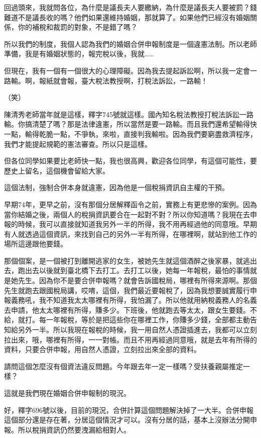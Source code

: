 \documentclass[]{ctexbook}
\begin{document}
回過頭來，我就問各位，為什麼是議長夫人要繳納，為什麼是議長夫人要被罰？錢難道不是議長收的嗎？他們如果還維持婚姻，那就算了。如果他們已經沒有婚姻關係，你的補稅和裁罰的對象，不是錯了嗎？

所以我們的制度，我個人認為我們的婚姻合併申報制度是一個違憲法制。所以老師準備，我是有婚姻狀態的，報完稅以後，我就\ldots\ldots{}

但現在，我有一個有一個很大的心理障礙。因為我去提起訴訟啊，所以我一定會一路輸。啊，報紙就會報，臺大稅法教授啊，打稅法訴訟，一路輸！

（笑）

陳清秀老師當年就是這樣，釋字745號就這樣。國內知名稅法教授打稅法訴訟一路輸。你搞清楚了嗎？那是法律違憲，所以當然是要一路輸。而且我們還希望輸得快一點，輸得乾脆一點，不爭執，來啦，直接判我輸啦。因為我們要窮盡救濟程序，我們才能提起規範的憲法審查。所以只是這樣。

但各位同學如果要比老師快一點，我也很高興，歡迎各位同學，有這個可能性，要歷史上留名，這個機會留給大家。

這個法制，強制合併本身就違憲，因為他是一個稅捐資訊自主權的干預。

早期74年，更早之前，沒有那個分居解釋函令之前，實務上有更悲慘的案例。因為當你結婚之後，兩個人的稅捐資訊要合在一起對不對？所以你知道嗎？我現在去申報的時候，我可以直接就知道我另外一半的所得，我不用再經過他的同意哦。早期有人就透過這個資訊，來找到自己的另外一半有所得，在哪裡啊，就站到他工作的場所這邊跟他要錢。

那個個案，是一個被打到離開逃家的女生，被她先生就這個酒醉之後家暴，就逃出去，跑出去以後就到臺北橋下去打工。去打工以後，她每一年報稅，最怕的事情就是她先生。因為你不是要合併申報嗎？就會告訴國稅局，哪裡有所得來源啊。那個先生就跑去跟國稅局講，哎唷，這個，我們最近要報稅了，因為我想要誠實履行申報義務吼，我不知道我太太哪裡有所得，我怕漏了。所以他就用納稅義務人的名義去申請，他太太哪裡有所得，賺多少。下班後，他就跑去等太太，跟女生要錢。不給，就打。每一年報稅，等於是把這些你在哪裡工作，你賺多少錢，全部都主動告知給另外一半。所以我現在報稅的時候，我一用自然人憑證插進去，我都可以立刻拉出來，哦，哪裡有所得，一一對帳。而且不用再經過同意哦，就是去年有所得的資料，只要合併申報，用自然人憑證，立刻拉出來全部的資料。

請問這個怎麼沒有個資法違反問題。今年跟去年一定一樣嗎？受扶養親屬推定一樣？

這就是我們現在婚姻合併申報制的現況。

好，釋字696號以後，目前的現況，合併計算這個問題解決掉了一大半。合併申報這個部分還是存在著，分居這個情況才可以。沒有分居的話，基本上沒辦法分開申報。所以稅捐資訊仍然要洩漏給相對人。
\end{document}
